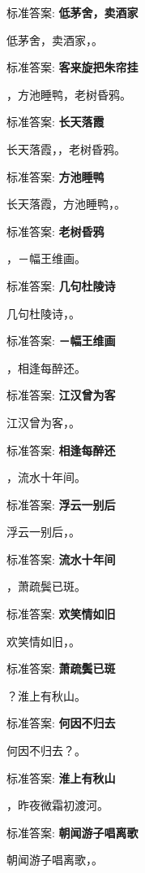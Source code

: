 \documentclass[12pt, a4paper, addpoints]{exam}
\begin{document}
\begin{questions}
标准答案: \textbf{低茅舍，卖酒家}

\question[1] 低茅舍，卖酒家，\uline{\qquad\qquad\qquad}。

标准答案: \textbf{客来旋把朱帘挂}

\question[1] \uline{\qquad\qquad\qquad}，方池睡鸭，老树昏鸦。

标准答案: \textbf{长天落霞}

\question[1] 长天落霞，\uline{\qquad\qquad\qquad}，老树昏鸦。

标准答案: \textbf{方池睡鸭}

\question[1] 长天落霞，方池睡鸭，\uline{\qquad\qquad\qquad}。

标准答案: \textbf{老树昏鸦}

\question[1] \uline{\qquad\qquad\qquad}，－幅王维画。

标准答案: \textbf{几句杜陵诗}

\question[1] 几句杜陵诗，\uline{\qquad\qquad\qquad}。

标准答案: \textbf{－幅王维画}

\question[1] \uline{\qquad\qquad\qquad}，相逢每醉还。

标准答案: \textbf{江汉曾为客}

\question[1] 江汉曾为客，\uline{\qquad\qquad\qquad}。

标准答案: \textbf{相逢每醉还}

\question[1] \uline{\qquad\qquad\qquad}，流水十年间。

标准答案: \textbf{浮云一别后}

\question[1] 浮云一别后，\uline{\qquad\qquad\qquad}。

标准答案: \textbf{流水十年间}

\question[1] \uline{\qquad\qquad\qquad}，萧疏鬓已斑。

标准答案: \textbf{欢笑情如旧}

\question[1] 欢笑情如旧，\uline{\qquad\qquad\qquad}。

标准答案: \textbf{萧疏鬓已斑}

\question[1] \uline{\qquad\qquad\qquad}？淮上有秋山。

标准答案: \textbf{何因不归去}

\question[1] 何因不归去？\uline{\qquad\qquad\qquad}。

标准答案: \textbf{淮上有秋山}

\question[1] \uline{\qquad\qquad\qquad}，昨夜微霜初渡河。

标准答案: \textbf{朝闻游子唱离歌}

\question[1] 朝闻游子唱离歌，\uline{\qquad\qquad\qquad}。


\end{questions}
\end{document}
